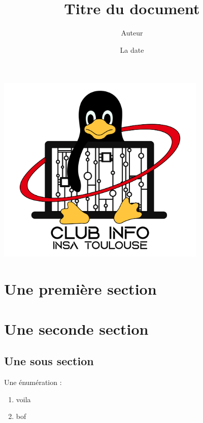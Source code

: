 \documentclass[10pt]{article}
\title{Titre du document}
\author{Auteur}
\date{La date}
\begin{document}
    \maketitle
    \begin{center}
    \includegraphics[width=10cm]{logo dos pull ecran blanc.png}
    \end{center}
    \begin{center}
    \end{center}
    \newpage
    \AddToShipoutPicture{\BackgroundPic} 
    \fontsize{12}{12}\selectfont
    \tableofcontents %
    \newpage %
    
    \section{Une première section}
    
    \section{Une seconde section}
    
    \subsection{Une sous section}

    Une énumération :
    \begin{enumerate}
        \item voila
        \item bof
    \end{enumerate}
\end{document}
